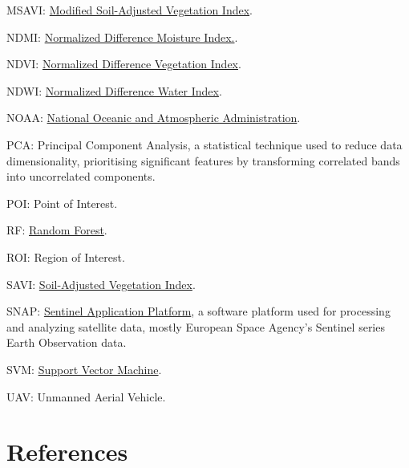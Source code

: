 \documentclass[
  letterpaper,
  DIV=11,
  numbers=noendperiod]{scrreprt}
\begin{document}
MSAVI: \protect\hyperlink{week-3-atmosphere-corrections}{Modified
Soil-Adjusted Vegetation Index}.

NDMI: \protect\hyperlink{week-3-atmosphere-corrections}{Normalized
Difference Moisture Index.}.

NDVI: \protect\hyperlink{week-3-atmosphere-corrections}{Normalized
Difference Vegetation Index}.

NDWI: \protect\hyperlink{week-3-atmosphere-corrections}{Normalized
Difference Water Index}.

NOAA: \href{https://oceanservice.noaa.gov/about/}{National Oceanic and
Atmospheric Administration}.

PCA: Principal Component Analysis, a statistical technique used to
reduce data dimensionality, prioritising significant features by
transforming correlated bands into uncorrelated components.

POI: Point of Interest.

RF:
\protect\hyperlink{week-7-classification-with-google-earth-engine-i}{Random
Forest}.

ROI: Region of Interest.

SAVI: \protect\hyperlink{week-3-atmosphere-corrections}{Soil-Adjusted
Vegetation Index}.

SNAP: \href{https://step.esa.int/main/toolboxes/snap/}{Sentinel
Application Platform}, a software platform used for processing and
analyzing satellite data, mostly European Space Agency's Sentinel series
Earth Observation data.

SVM: \href{https://www.youtube.com/watch?v=efR1C6CvhmE}{Support Vector
Machine}.

UAV: Unmanned Aerial Vehicle.


\hypertarget{references}{%
\chapter*{References}\label{references}}

\end{document}
